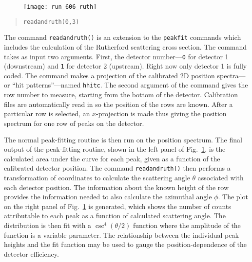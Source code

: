 \begin{figure}
\texttt{[image: run\_606\_ruth]}%
\caption{}%
\label{ruth}%
\end{figure}

\begin{quote}
\begin{Verbatim}[firstnumber=0]
readandruth(0,3)
\end{Verbatim}
\end{quote}
The command \texttt{readandruth()} is an extension to the \texttt{peakfit} commands which includes the calculation of the Rutherford scattering cross section. The command takes as input two arguments. First, the detector number---\texttt{0} for detector 1 (downstream) and \texttt{1} for detector 2 (upstream). Right now only detector 1 is fully coded. The command makes a projection of the calibrated 2D position spectra---or ``hit patterns''---named \texttt{hhitc}. The second argument of the command gives the row number to measure, starting from the bottom of the detector. Calibration files are automatically read in so the position of the rows are known. After a particular row is selected, an $x$-projection is made thus giving the position spectrum for one row of peaks on the detector.

The normal peak-fitting routine is then run on the position spectrum. The final output of the peak-fitting routine, shown in the left panel of Fig.~\ref{ruth}, is the calculated area under the curve for each peak, given as a function of the calibrated detector position. The command \texttt{readandruth()} then performs a transformation of coordinates to calculate the scattering angle $\theta$ associated with each detector position. The information about the known height of the row provides the information needed to also calculate the azimuthal angle $\phi$. The plot on the right panel of Fig.~\ref{ruth} is generated, which shows the number of counts attributable to each peak as a function of calculated scattering angle. The distribution is then fit with a $\csc^4 (\theta/2)$ function where the amplitude of the function is a variable parameter. The relationship between the individual peak heights and the fit function may be used to gauge the position-dependence of the detector efficiency.